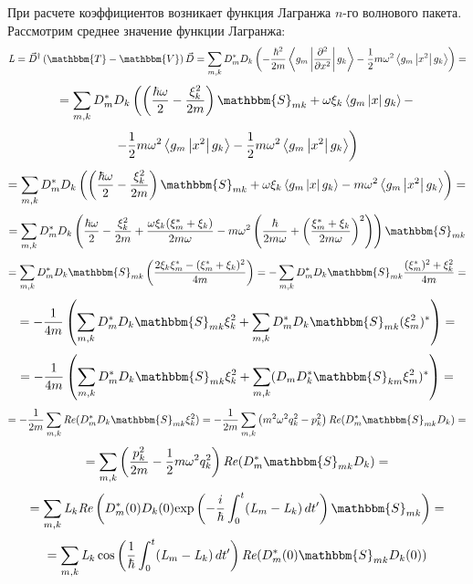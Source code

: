 При расчете коэффициентов возникает функция Лагранжа $n$-го волнового пакета.
Рассмотрим среднее значение функции Лагранжа:
$$\myl = \vec{D}^{\dagger}\left(\mathbbm{T}-\mathbbm{V}\right)\vec{D}=%
	 \sum_{m,k}D_m^*D_k\left(-\frac{\hbar^2}{2m}\mymean{g_m}{\frac{\partial^2}{\partial x^2}}{g_k}-%
				  \frac{1}{2}m\omega^2\mymean{g_m}{x^2}{g_k}\right)=$$
$$=\sum_{m,k}D_m^*D_k\left(\left(\frac{\hbar\omega}{2}-\frac{\xi_k^2}{2m}\right)\mathbbm{S}_{mk}+\omega\xi_k\mymean{g_m}{x}{g_k}-\right.$$
$$		\left.-\frac{1}{2}m\omega^2\left\langle g_m \left| x^2 \right| g_k \right\rangle-\frac{1}{2}m\omega^2\left\langle g_m \left| x^2 \right| g_k \right\rangle\right)$$
$$=\sum_{m,k}D_m^*D_k\left(\left(\frac{\hbar\omega}{2}-\frac{\xi_k^2}{2m}\right)\mathbbm{S}_{mk}+\omega\xi_k\mymean{g_m}{x}{g_k}-%
			   m\omega^2\mymean{g_m}{x^2}{g_k}\right)=$$
$$=\sum_{m,k}D_m^*D_k\left(\frac{\hbar\omega}{2}-\frac{\xi_k^2}{2m}+\frac{\omega\xi_k(\xi_m^*+\xi_k)}{2m\omega}-%
		   m\omega^2\left(\frac{\hbar}{2m\omega}+\left(\frac{\xi_m^*+\xi_k}{2m\omega}\right)^2\right)\right)\mathbbm{S}_{mk}$$
$$=\sum_{m,k}D_m^*D_k\mathbbm{S}_{mk}\left(\frac{2\xi_k\xi_m^*-(\xi_m^*+\xi_k)^2}{4m}\right)=%
  -\sum_{m,k}D_m^*D_k\mathbbm{S}_{mk}\frac{(\xi_m^*)^2+\xi_k^2}{4m}=$$
$$=-\frac{1}{4m}\left(\sum_{m,k}D_m^*D_k\mathbbm{S}_{mk}\xi_k^2+\sum_{m,k}D_m^*D_k\mathbbm{S}_{mk}(\xi_m^2)^*\right)=$$
$$=-\frac{1}{4m}\left(\sum_{m,k}D_m^*D_k\mathbbm{S}_{mk}\xi_k^2+\sum_{m,k}(D_mD_k^*\mathbbm{S}_{km}\xi_m^2)^*\right)=$$
$$=-\frac{1}{2m}\sum_{m,k}\mathit{Re}(D_m^*D_k\mathbbm{S}_{mk}\xi_k^2)=%
   -\frac{1}{2m}\sum_{m,k}\left(m^2\omega^2q_k^2-p_k^2\right)\mathit{Re}(D_m^*\mathbbm{S}_{mk}D_k)=$$
$$=\sum_{m,k}\left(\frac{p_k^2}{2m}-\frac{1}{2}m\omega^2q_k^2\right)\mathit{Re}(D_m^*\mathbbm{S}_{mk}D_k)=$$
$$=\sum_{m,k}\myl_k\mathit{Re}\left(D_m^*(0)D_k(0)\myexp{-\frac{i}{\hbar}\int_0^t(\myl_m-\myl_k)\,dt'}\mathbbm{S}_{mk}\right) = $$
$$= \sum_{m,k}\myl_k\cos\left(\frac{1}{\hbar}\int_0^t(\myl_m-\myl_k)\,dt'\right)\mathit{Re}(D_m^*(0)\mathbbm{S}_{mk}D_k(0))$$

